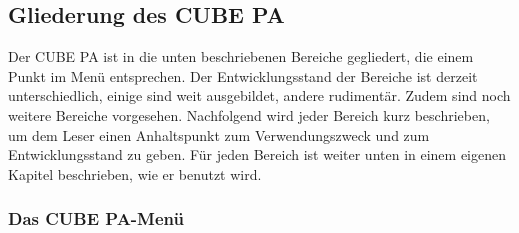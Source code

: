\subsection{Gliederung des CUBE PA} %

Der CUBE PA ist in die unten beschriebenen Bereiche gegliedert, die einem Punkt im Menü entsprechen. Der Entwicklungsstand der Bereiche ist derzeit unterschiedlich, einige sind weit ausgebildet, andere rudimentär. Zudem sind noch weitere Bereiche vorgesehen. Nachfolgend wird jeder Bereich kurz beschrieben, um dem Leser einen Anhaltspunkt zum Verwendungszweck und zum Entwicklungsstand zu geben. Für jeden Bereich ist weiter unten in einem eigenen Kapitel beschrieben, wie er benutzt wird.

\pagebreak
\subsubsection{Das CUBE PA-Menü} %

\setlength{\abovecaptionskip}{0pt}

